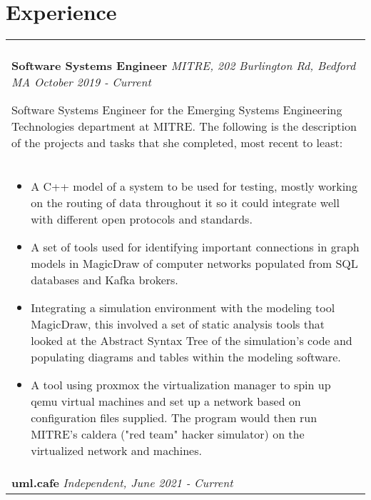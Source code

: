 \documentclass[11pt]{article}
\begin{document}
\section*{Experience}
\begin{tabular}{p{18.5cm}}
    \hline
    \multicolumn{1}{c}{} \\

    \large \textbf{Software Systems Engineer} \normalsize \textit{MITRE, 202 Burlington Rd, Bedford MA \hfill October 2019 - Current}

    \> Software Systems Engineer for the Emerging Systems Engineering Technologies department at MITRE. The following is the 
    description of the projects and tasks that she completed, most recent to least:\\ 

    \begin{itemize}[noitemsep,topsep=0pt]
      \item A C++ model of a system to be used for testing, mostly working on the routing of data throughout it so it could 
      integrate well with different open protocols and standards.
      \item A set of tools used for identifying important connections in graph models in MagicDraw of computer networks populated from SQL 
      databases and Kafka brokers.
      \item Integrating a simulation environment with the modeling tool MagicDraw, this involved 
      a set of static analysis tools that looked at the Abstract Syntax Tree of the simulation's code and populating diagrams and 
      tables within the modeling software.
      \item A tool using proxmox the virtualization manager to spin up qemu virtual machines and 
      set up a network based on configuration files supplied. The program would then run MITRE's caldera ("red team" hacker simulator) on 
      the virtualized network and machines.
    \end{itemize}\\

    \large \textbf{uml.cafe} \normalsize \textit{Independent, \hfill June 2021 - Current}


\end{tabular}
\end{document}
